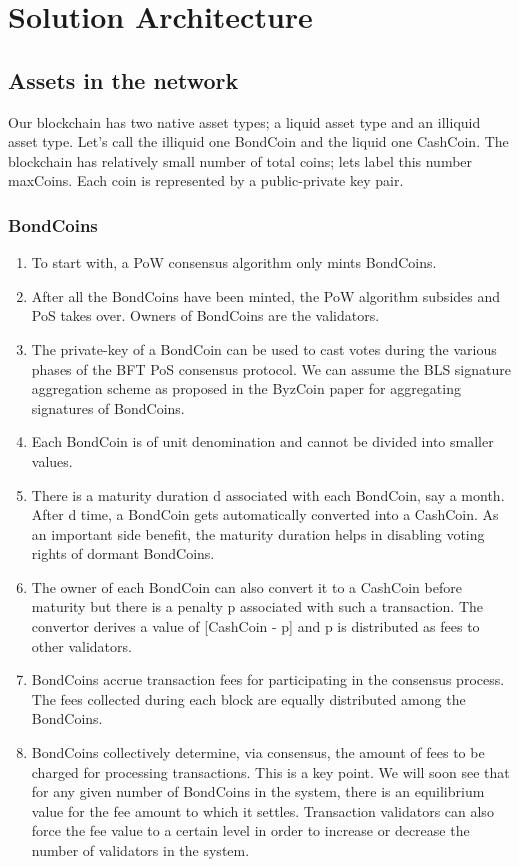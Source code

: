 \section{Solution Architecture}

\subsection{Assets in the network}

Our blockchain has two native asset types; a liquid asset type and an illiquid asset type. Let’s call the illiquid one BondCoin and the liquid one CashCoin. The blockchain has relatively small number of total coins; lets label this number maxCoins. Each coin is represented by a public-private key pair.

\subsubsection{BondCoins}

\begin{enumerate}
    \item To start with, a PoW consensus algorithm only mints BondCoins.
    \item After all the BondCoins have been minted, the PoW algorithm subsides and PoS takes over. Owners of BondCoins are the validators.
    \item The private-key of a BondCoin can be used to cast votes during the various phases of the BFT PoS consensus protocol. We can assume the BLS signature aggregation scheme as proposed in the ByzCoin paper for aggregating signatures of BondCoins.
    \item Each BondCoin is of unit denomination and cannot be divided into smaller values.
    \item There is a maturity duration d associated with each BondCoin, say a month. After d time, a BondCoin gets automatically converted into a CashCoin. As an important side benefit, the maturity duration helps in disabling voting rights of dormant BondCoins.
    \item The owner of each BondCoin can also convert it to a CashCoin before maturity but there is a penalty p associated with such a transaction. The convertor derives a value of [CashCoin - p] and p is distributed as fees to other validators.
    \item BondCoins accrue transaction fees for participating in the consensus process. The fees collected during each block are equally distributed among the BondCoins.
    \item BondCoins collectively determine, via consensus, the amount of fees to be charged for processing transactions. This is a key point. We will soon see that for any given number of BondCoins in the system, there is an equilibrium value for the fee amount to which it settles. Transaction validators can also force the fee value to a certain level in order to increase or decrease the number of validators in the system.

\end{enumerate}

